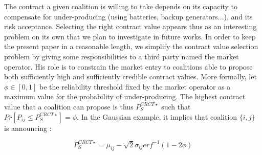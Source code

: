 \documentclass[journal]{IEEEtran}
\begin{document}
The contract a given coalition is willing to take depends on its capacity to compensate for under-producing (using batteries, backup generators...), and its risk acceptance. Selecting the right contract value appears thus as an interesting problem on its own that we plan to investigate in future works. In order to keep the present paper in a reasonable length, we simplify the contract value selection problem by giving some responsibilities to a third party named the market operator. His role is to constrain the market entry to coalitions able to propose both sufficiently high and sufficiently credible contract values. More formally, let $ \phi \in [0,1] $ be the reliability threshold fixed by the market operator as a maximum value for the probability of under-producing. The highest contract value that a coalition can propose is thus $ P_{S}^{CRCT \star} $ such that $ Pr[P_{ij} \leq P_{S}^{CRCT \star}] = \phi $. In the Gaussian example, it implies that coalition $ \{i,j\}$ is announcing :

\begin{equation}
\label{eq:P_star}
P_{S}^{CRCT \star} = \mu_{ij} - \sqrt{2} \sigma_{ij} erf^{-1}( 1 - 2 \phi )
\end{equation}
\end{document}
